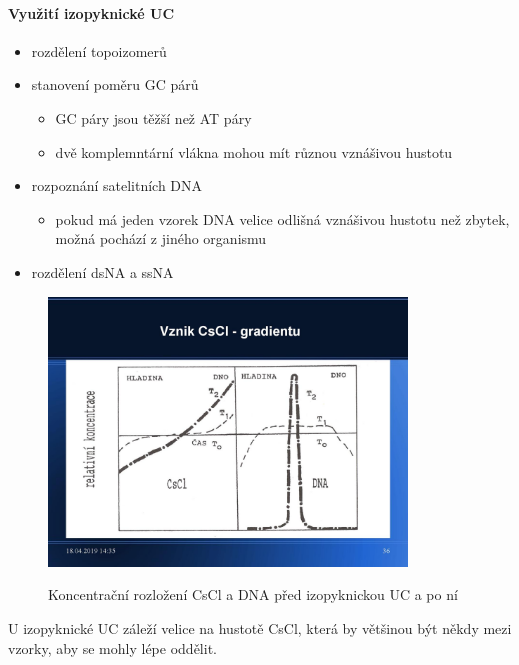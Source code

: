 \documentclass[DIV=8]{scrreprt}
\begin{document}
\paragraph{Využití izopyknické UC}
\begin{itemize}[nosep]
    \item rozdělení topoizomerů
    \item stanovení poměru GC párů
\begin{itemize}[nosep]
    \item GC páry jsou těžší než AT páry
    \item dvě komplemntární vlákna mohou mít různou vznášivou hustotu
\end{itemize}

    \item rozpoznání satelitních DNA
\begin{itemize}[nosep]
    \item pokud má jeden vzorek DNA velice odlišná vznášivou hustotu než zbytek, možná pochází z jiného organismu
\end{itemize}

    \item rozdělení dsNA a ssNA
\end{itemize}



\begin{figure}
    \caption{Koncentrační rozložení CsCl a DNA před izopyknickou UC a po ní}
    \includegraphics[width=0.85\textwidth]{slides-7/slide-34.jpg}
    \centering
    \label{}
\end{figure}


U izopyknické UC záleží velice na hustotě CsCl, která by většinou být někdy mezi vzorky, aby se mohly lépe oddělit.
\end{document}
